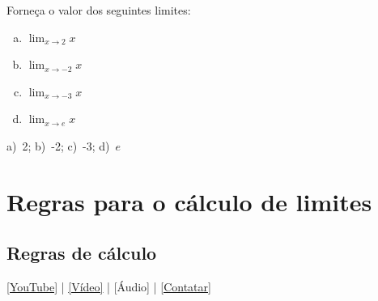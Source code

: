\begin{exer}
  Forneça o valor dos seguintes limites:
  \begin{enumerate}[a)]
  \item $\displaystyle \lim_{x\to 2} x$
  \item $\displaystyle \lim_{x\to -2} x$
  \item $\displaystyle \lim_{x\to -3} x$
  \item $\displaystyle \lim_{x\to e} x$
  \end{enumerate}
\end{exer}
\begin{resp}
  a)~2; b)~-2; c)~-3; d)~$e$
\end{resp}

\section{Regras para o cálculo de limites}\label{cap_lim_sec_regras}

\subsection{Regras de cálculo}

\begin{flushright}
  \href{https://youtu.be/chAoC7xoeYM}{[YouTube]} | \href{https://archive.org/details/video_20220629_1213}{[Vídeo]} | [Áudio] | \href{https://phkonzen.github.io/notas/contato.html}{[Contatar]}
\end{flushright}


